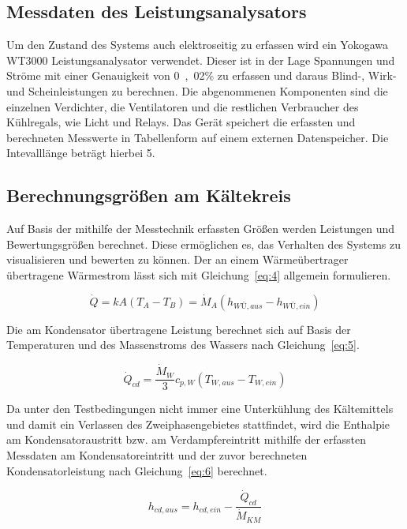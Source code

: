 \subsection{Messdaten des Leistungsanalysators}
\label{subsec:Messdaten des Leistungsanalysators}

Um den Zustand des Systems auch elektroseitig zu erfassen wird ein Yokogawa WT3000 Leistungsanalysator verwendet. Dieser ist in der Lage Spannungen und Ströme mit einer Genauigkeit von \unit{0,02}{\%} zu erfassen und daraus Blind-, Wirk- und Scheinleistungen zu berechnen. Die abgenommenen Komponenten sind die einzelnen Verdichter, die Ventilatoren und die restlichen Verbraucher des Kühlregals, wie Licht und Relays.
Das Gerät speichert die erfassten und berechneten Messwerte in Tabellenform auf einem externen Datenspeicher. Die Intevalllänge beträgt hierbei \unit{5}{\second}.


\subsection{Berechnungsgrößen am Kältekreis}
\label{subsec:Berechnungsgrössen}

Auf Basis der mithilfe der Messtechnik erfassten Größen werden Leistungen und Bewertungsgrößen berechnet. Diese ermöglichen es, das Verhalten des Systems zu visualisieren und bewerten zu können.
Der an einem Wärmeübertrager übertragene Wärmestrom lässt sich mit Gleichung~\ref{eq:4} allgemein formulieren.

\begin{equation}
\label{eq:4}
\dot{Q}= kA(T_A - T_B) = \dot{M}_{A}(h_{WÜ,aus} - h_{WÜ,ein})
\end{equation}

Die am Kondensator übertragene Leistung berechnet sich auf Basis der Temperaturen und des Massenstroms des Wassers nach Gleichung~\ref{eq:5}.

\begin{equation}
\label{eq:5}
\dot{Q}_{cd}= \frac{\dot{M}_{W}}{3} c_{p,W} (T_{W,aus} - T_{W,ein})
\end{equation}

Da unter den Testbedingungen nicht immer eine Unterkühlung des Kältemittels und damit ein Verlassen des Zweiphasengebietes stattfindet, wird die Enthalpie am Kondensatoraustritt bzw. am Verdampfereintritt mithilfe der erfassten Messdaten am Kondensatoreintritt und der zuvor berechneten Kondensatorleistung nach Gleichung~\ref{eq:6} berechnet.

\begin{equation}
\label{eq:6}
h_{cd,aus} = h_{cd,ein} - \frac{\dot{Q}_{cd}}{\dot{M}_{KM}}
\end{equation}

